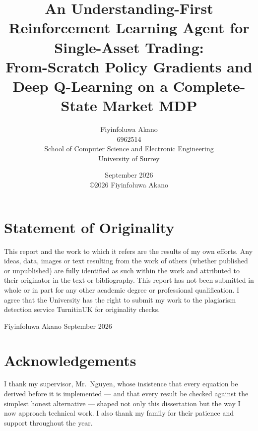 \documentclass[11pt,a4paper]{report}
\title{An Understanding-First Reinforcement Learning Agent for
Single-Asset Trading:\\ From-Scratch Policy Gradients and Deep
Q-Learning on a Complete-State Market MDP}
\author{Fiyinfoluwa Akano \\ 6962514 \\[1ex]
School of Computer Science and Electronic Engineering\\
University of Surrey}
\date{September 2026 \\[1ex] \copyright 2026 Fiyinfoluwa Akano}
\begin{document}
\maketitle

\chapter*{Statement of Originality}
This report and the work to which it refers are the results of my own
efforts. Any ideas, data, images or text resulting from the work of
others (whether published or unpublished) are fully identified as such
within the work and attributed to their originator in the text or
bibliography. This report has not been submitted in whole or in part for
any other academic degree or professional qualification. I agree that the
University has the right to submit my work to the plagiarism detection
service TurnitinUK for originality checks.

\vspace{2em}
\noindent Fiyinfoluwa Akano \hfill September 2026

\chapter*{Acknowledgements}
I thank my supervisor, Mr.\ Nguyen, whose insistence that every equation
be derived before it is implemented --- and that every result be checked
against the simplest honest alternative --- shaped not only this
dissertation but the way I now approach technical work. I also thank my
family for their patience and support throughout the year.
\end{document}
